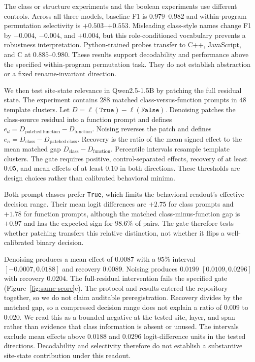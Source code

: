 \documentclass{article}
\begin{document}
The class or structure experiments and the boolean experiments use different
controls. Across all three models, baseline F1 is $0.979$--$0.982$ and within-program permutation
selectivity is
$+0.503$--$+0.553$. Misleading class-style names change F1 by
$-0.004$, $-0.004$, and $+0.004$, but this role-conditioned vocabulary
prevents a robustness interpretation. Python-trained probes transfer to C++,
JavaScript, and C at $0.885$--$0.980$. These results support decodability and
performance above the specified within-program permutation task. They do not
establish abstraction or a fixed rename-invariant direction.

We then test site-state relevance in Qwen2.5-1.5B by patching the full residual
state. The experiment contains $288$ matched class-versus-function prompts in
$48$ template clusters. Let
$D=\ell(\texttt{True})-\ell(\texttt{False})$. Denoising patches the
class-source residual into a function prompt and defines
$e_d=D_{\mathrm{patched\ function}}-D_{\mathrm{function}}$. Noising reverses
the patch and defines
$e_n=D_{\mathrm{class}}-D_{\mathrm{patched\ class}}$. Recovery is the ratio of
the mean signed effect to the mean matched gap
$D_{\mathrm{class}}-D_{\mathrm{function}}$. Percentile intervals resample
template clusters. The gate requires positive, control-separated effects,
recovery of at least $0.05$, and mean effects of at least $0.10$ in both
directions. These thresholds are design choices rather than calibrated
behavioral minima.

Both prompt classes prefer \texttt{True}, which limits the behavioral
readout's effective decision range. Their mean logit differences are $+2.75$ for class prompts and
$+1.78$ for function prompts, although the matched class-minus-function gap is
$+0.97$ and has the expected sign for $98.6\%$ of pairs. The gate therefore
tests whether patching transfers this relative distinction, not whether it
flips a well-calibrated binary decision.

Denoising produces a mean effect of $0.0087$ with a $95\%$ interval
$[-0.0007,0.0188]$ and recovery $0.0089$. Noising produces $0.0199$
$[0.0109,0.0296]$ with recovery $0.0204$. The full-residual intervention fails
the specified gate (Figure~\ref{fig:same-score}c). The protocol and results entered the repository together,
so we do not claim auditable preregistration. Recovery divides by the matched
gap, so a compressed decision range does not explain a ratio of $0.009$ to
$0.020$. We read this as a bounded negative at the tested site, layer, and
span rather than evidence that class information is absent or unused. The
intervals exclude mean effects above $0.0188$ and $0.0296$ logit-difference
units in the tested directions. Decodability and selectivity therefore do not
establish a substantive site-state contribution under this readout.
\end{document}
